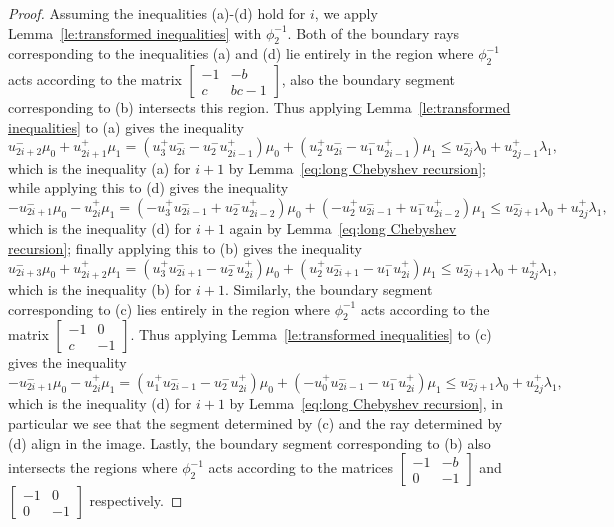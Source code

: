 \documentclass{amsart}
\numberwithin{theorem}{section}
\begin{document}
\begin{proof}
    Assuming the inequalities (a)-(d) hold for $i$, we apply Lemma~\ref{le:transformed inequalities} with $\phi_2^{-1}$.
    Both of the boundary rays corresponding to the inequalities (a) and (d) lie entirely in the region where $\phi_2^{-1}$ acts according to the matrix $\left[ \begin{array}{cc} -1 & -b\\ c & bc-1 \end{array}\right]$, also the boundary segment corresponding to (b) intersects this region.
    Thus applying Lemma~\ref{le:transformed inequalities} to (a) gives the inequality 
    \[u_{2i+2}^-\mu_0+u_{2i+1}^+\mu_1=(u_3^+u_{2i}^--u_2^-u_{2i-1}^+)\mu_0+(u_2^+u_{2i}^--u_1^-u_{2i-1}^+)\mu_1\le u_{2j}^-\lambda_0+u_{2j-1}^+\lambda_1,\]
    which is the inequality (a) for $i+1$ by Lemma~\ref{eq:long Chebyshev recursion}; while applying this to (d) gives the inequality 
    \[-u_{2i+1}^-\mu_0-u_{2i}^+\mu_1=(-u_3^+u_{2i-1}^-+u_2^-u_{2i-2}^+)\mu_0+(-u_2^+u_{2i-1}^-+u_1^-u_{2i-2}^+)\mu_1\le u_{2j+1}^-\lambda_0+u_{2j}^+\lambda_1,\]
    which is the inequality (d) for $i+1$ again by Lemma~\ref{eq:long Chebyshev recursion}; finally applying this to (b) gives the inequality 
    \[u_{2i+3}^-\mu_0+u_{2i+2}^+\mu_1=(u_3^+u_{2i+1}^--u_2^-u_{2i}^+)\mu_0+(u_2^+u_{2i+1}^--u_1^-u_{2i}^+)\mu_1\le u_{2j+1}^-\lambda_0+u_{2j}^+\lambda_1,\]
    which is the inequality (b) for $i+1$.
    Similarly, the boundary segment corresponding to (c) lies entirely in the region where $\phi_2^{-1}$ acts according to the matrix $\left[ \begin{array}{cc} -1 & 0\\ c & -1 \end{array}\right]$.
    Thus applying Lemma~\ref{le:transformed inequalities} to (c) gives the inequality 
    \[-u_{2i+1}^-\mu_0-u_{2i}^+\mu_1=(u_1^+u_{2i-1}^--u_2^-u_{2i}^+)\mu_0+(-u_0^+u_{2i-1}^--u_1^-u_{2i}^+)\mu_1\le u_{2j+1}^-\lambda_0+u_{2j}^+\lambda_1,\]
    which is the inequality (d) for $i+1$ by Lemma~\ref{eq:long Chebyshev recursion}, in particular we see that the segment determined by (c) and the ray determined by (d) align in the image.
    Lastly, the boundary segment corresponding to (b) also intersects the regions where $\phi_2^{-1}$ acts according to the matrices $\left[ \begin{array}{cc} -1 & -b\\ 0 & -1 \end{array}\right]$ and $\left[ \begin{array}{cc} -1 & 0\\ 0 & -1 \end{array}\right]$ respectively.

\end{proof}
\end{document}
